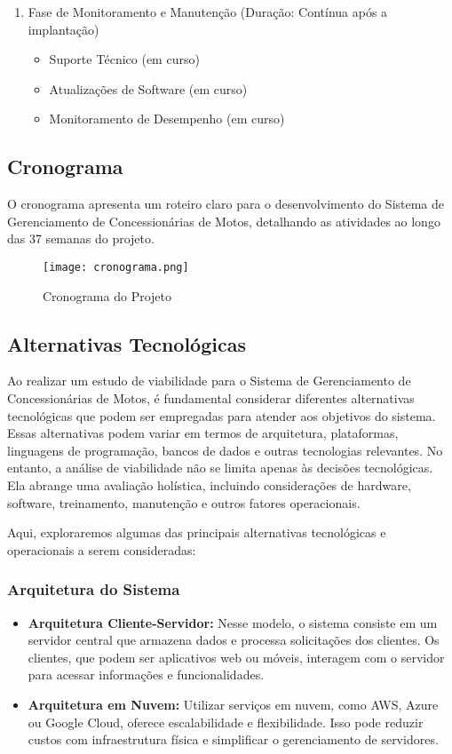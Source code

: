 \begin{enumerate}
	\item Fase de Monitoramento e Manutenção (Duração: Contínua após a implantação)
\begin{itemize}
	\item Suporte Técnico (em curso)
	\item Atualizações de Software (em curso)
	\item Monitoramento de Desempenho (em curso)
\end{itemize}

\end{enumerate}

       \subsection{Cronograma }
		O cronograma apresenta um roteiro claro para o desenvolvimento do Sistema de Gerenciamento de Concessionárias de Motos, detalhando as atividades ao longo das 37 semanas do projeto.
		
		\begin{figure}[h]
			\centering
			\texttt{[image: cronograma.png]}
			\caption{Cronograma do Projeto}
			\label{fig:cronograma}
		\end{figure}
		
       \subsection{Alternativas Tecnol\'{o}gicas }
       Ao realizar um estudo de viabilidade para o Sistema de Gerenciamento de Concessionárias de Motos, é fundamental considerar diferentes alternativas tecnológicas que podem ser empregadas para atender aos objetivos do sistema. Essas alternativas podem variar em termos de arquitetura, plataformas, linguagens de programação, bancos de dados e outras tecnologias relevantes. No entanto, a análise de viabilidade não se limita apenas às decisões tecnológicas. Ela abrange uma avaliação holística, incluindo considerações de hardware, software, treinamento, manutenção e outros fatores operacionais.
       
       Aqui, exploraremos algumas das principais alternativas tecnológicas e operacionais a serem consideradas:
       
       \subsubsection{Arquitetura do Sistema}
       
       \begin{itemize}
       	\item \textbf{Arquitetura Cliente-Servidor:} Nesse modelo, o sistema consiste em um servidor central que armazena dados e processa solicitações dos clientes. Os clientes, que podem ser aplicativos web ou móveis, interagem com o servidor para acessar informações e funcionalidades.
       	\item \textbf{Arquitetura em Nuvem:} Utilizar serviços em nuvem, como AWS, Azure ou Google Cloud, oferece escalabilidade e flexibilidade. Isso pode reduzir custos com infraestrutura física e simplificar o gerenciamento de servidores.
       \end{itemize}
       
